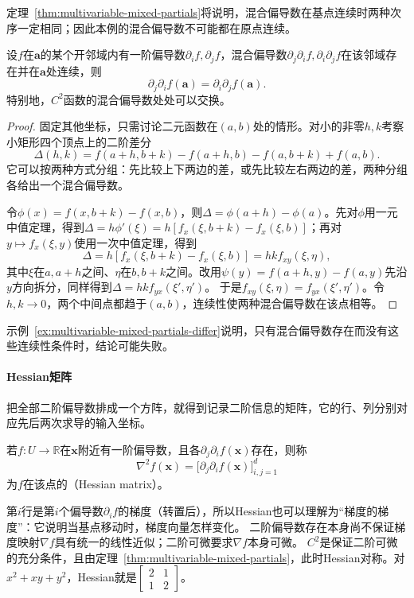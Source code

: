 定理~\ref{thm:multivariable-mixed-partials}将说明，混合偏导数在基点连续时两种次序一定相同；因此本例的混合偏导数不可能都在原点连续。
\begin{theorem}[混合偏导数的交换]
\label{thm:multivariable-mixed-partials}
设$f$在$\bm a$的某个开邻域内有一阶偏导数$\partial_i f,\partial_j f$，混合偏导数$\partial_j\partial_i f,\partial_i\partial_j f$在该邻域存在并在$\bm a$处连续，则
\[
 \partial_j\partial_i f(\bm a)=\partial_i\partial_j f(\bm a).
\]
特别地，$C^2$函数的混合偏导数处处可以交换。
\end{theorem}
\begin{proof}
固定其他坐标，只需讨论二元函数在$(a,b)$处的情形。对小的非零$h,k$考察小矩形四个顶点上的二阶差分
\[
 \Delta(h,k)=f(a+h,b+k)-f(a+h,b)-f(a,b+k)+f(a,b).
\]
它可以按两种方式分组：先比较上下两边的差，或先比较左右两边的差，两种分组各给出一个混合偏导数。

令$\phi(x)=f(x,b+k)-f(x,b)$，则$\Delta=\phi(a+h)-\phi(a)$。先对$\phi$用一元中值定理，得到$\Delta=h\phi'(\xi)=h[f_x(\xi,b+k)-f_x(\xi,b)]$；再对$y\mapsto f_x(\xi,y)$使用一次中值定理，得到
\[
 \Delta=h[f_x(\xi,b+k)-f_x(\xi,b)]=hk f_{xy}(\xi,\eta),
\]
其中$\xi$在$a,a+h$之间、$\eta$在$b,b+k$之间。改用$\psi(y)=f(a+h,y)-f(a,y)$先沿$y$方向拆分，同样得到$\Delta=hk f_{yx}(\xi',\eta')$。
于是$f_{xy}(\xi,\eta)=f_{yx}(\xi',\eta')$。令$h,k\to0$，两个中间点都趋于$(a,b)$，连续性使两种混合偏导数在该点相等。
\end{proof}
示例~\ref{ex:multivariable-mixed-partials-differ}说明，只有混合偏导数存在而没有这些连续性条件时，结论可能失败。

\paragraph{Hessian矩阵}
把全部二阶偏导数排成一个方阵，就得到记录二阶信息的矩阵，它的行、列分别对应先后两次求导的输入坐标。
\begin{definition}[Hessian矩阵]
\label{def:multivariable-hessian}
若$f:U\to\mathbb R$在$\bm x$附近有一阶偏导数，且各$\partial_j\partial_i f(\bm x)$存在，则称
\[
 \nabla^2f(\bm x)=\bigl[\partial_j\partial_i f(\bm x)\bigr]_{i,j=1}^d
\]
为$f$在该点的（Hessian matrix）。
\end{definition}
第$i$行是第$i$个偏导数$\partial_if$的梯度（转置后），所以Hessian也可以理解为“梯度的梯度”：它说明当基点移动时，梯度向量怎样变化。
二阶偏导数存在本身尚不保证梯度映射$\nabla f$具有统一的线性近似；二阶可微要求$\nabla f$本身可微。
$C^2$是保证二阶可微的充分条件，且由定理~\ref{thm:multivariable-mixed-partials}，此时Hessian对称。对$x^2+xy+y^2$，Hessian就是$\begin{bmatrix}2&1\\1&2\end{bmatrix}$。

